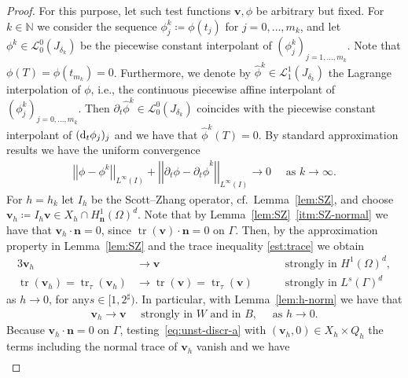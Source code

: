 \documentclass[reqno,a4paper]{amsart}
\def\norm#1{\left|\!\left| #1 \right|\!\right|}
\def\vec#1{\boldsymbol{#1}}
\def\tr{\mathop{\mathrm{tr}}\nolimits}
\def\d{{\rm d}}
\def\difft{\d_t}
\def\bn{\vec{n}}
\def\bv{\vec{v}}
\def\PiSZ{{I_h}}
\begin{document}
\begin{proof}
	For this purpose, let such test functions $\bv, \phi$ be arbitrary but fixed. 
	For $k \in \mathbb{N}$ we consider the sequence $\phi_j^k \coloneqq \phi(t_j)$ for $j = 0, \ldots, m_k$, and let $\phi^k \in\mathcal{L}^0_0(J_{\delta_k})$ be the piecewise constant interpolant of $(\phi_j^k)_{j = 1, \ldots, m_k}$. 
	Note that $\phi(T) = \phi(t_{m_k}) = 0 $. 
	Furthermore, we denote by $\widehat{\phi}^k \in \mathcal{L}^1_1(J_{\delta_k})$ the Lagrange interpolation of $\phi$, i.e., the continuous piecewise affine interpolant of  $(\phi_j^k)_{j = 0, \ldots, m_k}$. 
	Then $\partial_t \widehat \phi^k \in \mathcal{L}^0_0(J_{\delta_{k}})$  coincides with the piecewise constant interpolant of $(\difft \phi_j)_{j}$ and we have that $\widehat{\phi}^k(T) = 0$. 
	By standard approximation results we have the uniform convergence 
	\begin{align}\label{eq:unst-lim-phik}
		\norm{\phi - \phi^k}_{L^\infty(I)} + 
		\norm{\partial _t \phi - \partial_t \widehat{\phi}^k}_{L^\infty(I)} \to 0 \quad \text{ as } k \to \infty.
	\end{align}
	For $h = h_k$ let $\PiSZ$ be the Scott--Zhang operator, cf.~Lemma~\ref{lem:SZ}, and choose $\bv_h \coloneqq \PiSZ \bv \in X_{h} \cap H^1_{\bn}(\Omega)^d$. 
	Note that by Lemma~\ref{lem:SZ}~\ref{itm:SZ-normal} we have that $\bv_h \cdot \bn = 0$, since $\tr(\bv) \cdot \bn = 0$ on $\Gamma$.
		Then, by the approximation property in Lemma~\ref{lem:SZ} and the trace inequality \eqref{est:trace}
		we obtain 
	\begin{alignat}{3}\label{eq:unst-lim-vh}
		\bv_h &\to \bv \quad &&\text{ strongly in } H^{1}(\Omega)^d,\\ \label{eq:unst-lim-vh-tr}
		\tr(\bv_h)  = \tr_\tau (\bv_h)&\to \tr(\bv) = \tr_\tau(\bv) \quad &&\text{ strongly in } L^{s}(\Gamma)^d
	\end{alignat}
	as $h \to 0$, for any$s \in [1,2^\sharp)$.  
	In particular, with Lemma~\ref{lem:h-norm} we have that  
	\begin{align}\label{eq:unst-lim-vh-WB}
		\bv_h \to  \bv \quad \text{ strongly in } W \text{ and in } B, \quad \text{ as } h \to 0.
	\end{align}
	Because $\bv_h \cdot \bn = 0$ on $\Gamma$, testing~\eqref{eq:unst-discr-a} with $(\bv_h,0) \in X_h \times Q_h$ the terms including the normal trace of $\bv_h$ vanish and we have 
	\begin{equation}
		\begin{aligned}	\label{eq:unst-discr-v}

\end{aligned}
\end{equation}
\end{proof}
\end{document}
